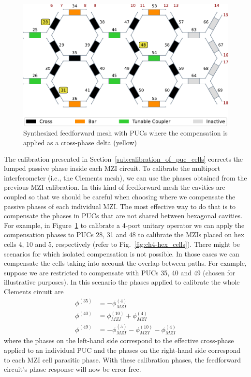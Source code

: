\begin{figure}
	\begin{center}
		\includegraphics{figures/ch4-superpuc_compensation.pdf}
	\end{center}
	\caption{Synthesized feedforward mesh with PUCs where the compensation is applied as a cross-phase delta
		(yellow)}\label{fig:ch4-superpuc_compensation}
\end{figure}

The calibration presented in Section~\ref{sub:calibration_of_puc_cells} corrects the lumped passive phase inside each MZI circuit.
To calibrate the multiport interferometer (i.e., the Clements mesh), we can use the phases obtained from the previous MZI calibration.
In this kind of feedforward mesh the cavities are coupled so that we should be careful when choosing where we compensate the passive phases of each individual MZI.
The most effective way to do that is to compensate the phases in PUCs that are not shared between hexagonal cavities.
For example, in Figure~\ref{fig:ch4-superpuc_compensation} to calibrate a 4-port unitary operator we can apply the compensation phases to PUCs 28, 31 and 48 to calibrate the MZIs placed on hex cells 4, 10 and 5, respectively (refer to Fig.~\ref{fig:ch4-hex_cells}).
There might be scenarios for which isolated compensation is not possible.
In those cases we can compensate the cells taking into account the overlap between paths.
For example, suppose we are restricted to compensate with PUCs 35, 40 and 49 (chosen for illustrative purposes).
In this scenario the phases applied to calibrate the whole Clements circuit are
\begin{equation}
	\begin{aligned}
		\phi^{(35)} & = -\phi^{(4)}_{MZI}                                        \\
		\phi^{(40)} & = \phi^{(10)}_{MZI} + \phi^{(4)}_{MZI}                     \\
		\phi^{(49)} & = -\phi^{(5)}_{MZI} - \phi^{(10)}_{MZI} - \phi^{(4)}_{MZI}
	\end{aligned}
	\label{eq:ch4-clements_calib_complex}
\end{equation}
where the phases on the left-hand side correspond to the effective cross-phase applied to an individual PUC and the phases on the right-hand side correspond to each MZI cell parasitic phase.
With these calibration phases, the feedforward circuit's phase response will now be error free.

